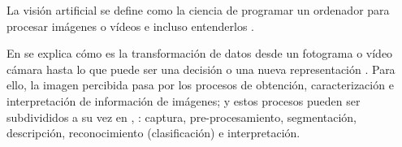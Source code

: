 La visión artificial se define como la ciencia de programar un ordenador para procesar imágenes o vídeos e incluso entenderlos \cite{Culjak12}.

En \cite{Bradski08} se explica cómo es la transformación de datos desde un fotograma o vídeo cámara hasta lo que puede ser una decisión o una nueva representación \cite{Alvear17}. Para ello, la imagen percibida pasa por los procesos de obtención, caracterización e interpretación de información de imágenes; y estos procesos pueden ser subdivididos a su vez en \cite{Santillan15}, \cite{Martinez22}: captura, pre-procesamiento, segmentación, descripción, reconocimiento (clasificación) e interpretación. %


 
 

